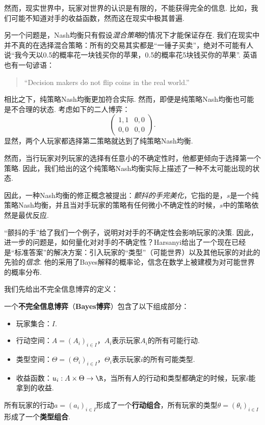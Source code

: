 然而，现实世界中，玩家对世界的认识是有限的，不能获得完全的信息. 比如，我们可能不知道对手的收益函数，然而这在现实中极其普遍. 

另一个问题是，Nash均衡只有假设\emph{混合策略}的情况下才能保证存在. 我们在现实中并不真的在选择混合策略：所有的交易其实都是“一锤子买卖”，绝对不可能有人说“我今天以0.5的概率花一块钱买你的苹果，0.5的概率花5块钱买你的苹果”. 英语也有一句谚语：
\begin{quotation}
“Decision makers do not flip coins in the real world.”
\end{quotation}

相比之下，纯策略Nash均衡更加符合实际. 然而，即便是纯策略Nash均衡也可能是不合理的状态. 考虑如下的二人博弈：
\[\begin{pmatrix}
1,1&0,0\\
0,0&0,0
\end{pmatrix}.\]
显然，两个人玩家都选择第二策略就达到了纯策略Nash均衡.

然而，当行玩家对列玩家的选择有任意小的不确定性时，他都更倾向于选择第一个策略. 因此，我们给出的这个纯策略Nash均衡实际上描述了一种不太可能出现的状态.

因此，一种Nash均衡的修正概念被提出：\emph{颤抖的手完美化}，它指的是，$s$是一个纯策略Nash均衡，并且当对手玩家的策略有任何微小不确定性的时候，$s$中的策略依然是最优反应.

“颤抖的手”给了我们一个例子，说明对对手的不确定性会影响玩家的决策. 因此，进一步的问题是，如何量化对对手的不确定性？Harsanyi给出了一个现在已经是“标准答案”的解决方案：引入玩家的“类型”（可能世界）以及其他玩家的对此的先验的\emph{信念}. 他的采用了Bayes解释的概率论，信念在数学上被建模为对可能世界的概率分布.

我们先给出不完全信息博弈的定义：

\begin{definition}
    一个\textbf{不完全信息博弈}（\textbf{Bayes博弈}）包含了以下组成部分：
\begin{itemize}
    \item 玩家集合：$I$.
    \item 行动空间：$A=(A_i)_{i\in I}$，$A_i$表示玩家$A_i$的所有可能行动.
    \item 类型空间：$\Theta=(\Theta_i)_{i\in I}$，$\Theta_i$表示玩家$i$的所有可能类型.
    \item 收益函数：$u_i:A\times\Theta\to\R$，当所有人的行动和类型都确定的时候，玩家$i$能拿到的收益.
\end{itemize}
所有玩家的行动$a=(a_i)_{i\in I}$形成了一个\textbf{行动组合}，所有玩家的类型$\theta=(\theta_i)_{i\in I}$形成了一个\textbf{类型组合}.
\end{definition}

